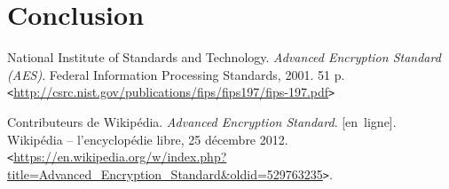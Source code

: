 \documentclass[12pt,a4paper]{report}
\newcommand{\burl}[1]{\texttt{<}\url{#1}\texttt{>}}
\begin{document}
\chapter{Conclusion}


\begin{thebibliography}{99}

 National Institute of Standards and Technology.
\emph{Advanced Encryption Standard (AES)}. Federal Information Processing
Standards, 2001. 51 p.
\burl{http://csrc.nist.gov/publications/fips/fips197/fips-197.pdf}

 Contributeurs de Wikipédia. \emph{Advanced Encryption Standard}. [en~ligne].
Wikipédia -- l'encyclopédie libre, 25 décembre 2012. \burl{https://en.wikipedia.org/w/index.php?title=Advanced_Encryption_Standard&oldid=529763235}.

\end{thebibliography}
\end{document}

